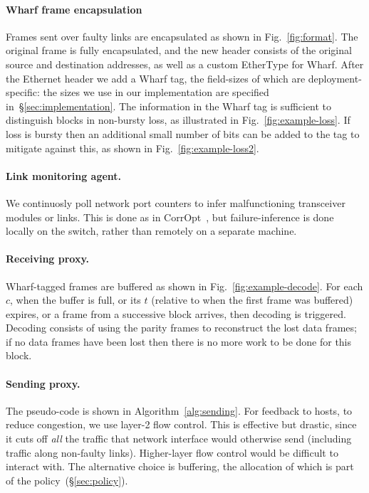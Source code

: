 \documentclass[sigconf]{acmart}
\newcommand{\OurSys}{Wharf\xspace}
\begin{document}
\paragraph{\OurSys frame encapsulation}
Frames sent over faulty links are encapsulated as shown in Fig.~\ref{fig:format}.
The original frame is fully encapsulated, and the new header consists of the original source and destination addresses, as well as a custom EtherType for \OurSys.
After the Ethernet header we add a \OurSys tag, the field-sizes of which
are deployment-specific: the sizes we use in our implementation are specified
in~\S\ref{sec:implementation}.
The information in the \OurSys tag is sufficient to distinguish blocks in
non-bursty loss, as illustrated in Fig.~\ref{fig:example-loss}. If loss is
bursty then an additional small number of bits can be added to the tag to
mitigate against this, as shown in Fig.~\ref{fig:example-loss2}.

\paragraph{Link monitoring agent.}
  We continuosly poll network port counters to infer malfunctioning transceiver
  modules or links. This is done as in
  CorrOpt~\cite{Zhuo:2017:UMP:3098822.3098849}, but failure-inference is done
  locally on the switch, rather than remotely on a separate machine.

\paragraph{Receiving proxy.}
\OurSys-tagged frames are buffered as shown in Fig.~\ref{fig:example-decode}.
For each $c$, when the buffer is full, or its $t$ (relative to when the first
frame was buffered) expires, or a frame from a successive block arrives, then
decoding is triggered. Decoding consists of using the parity frames to
reconstruct the lost data frames; if no data frames have been lost then there
is no more work to be done for this block.

\paragraph{Sending proxy.}
The pseudo-code is shown in Algorithm~\ref{alg:sending}.
For feedback to hosts, to reduce congestion, we use layer-2 flow control.
This is effective but drastic, since it cuts off \emph{all} the traffic that
network interface would otherwise send (including traffic along non-faulty
links). Higher-layer flow control would be difficult to interact with.
The alternative choice is buffering, the allocation of which is part of the
policy~(\S\ref{sec:policy}).
\end{document}
